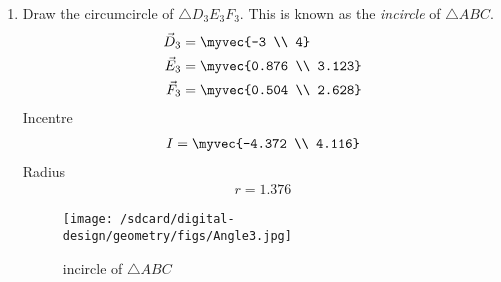 \documentclass[11pt]{book}
\begin{document}
\begin{enumerate}[label=\thesection.\arabic*.,ref=\thesection.\theenumi]
\item Draw the circumcircle of $\triangle D_3E_3F_3$.  This is known as the {\em incircle} of $\triangle ABC$. \\
\solution 
\begin{align}
    \vec{D}_3 &= \myvec{-3  \\ 4} \\
    \vec{E}_3 &= \myvec{0.876  \\ 3.123} \\
    \vec{F}_3 &= \myvec{0.504 \\ 2.628} 
\end{align}
Incentre 
\begin{align}
    I= \myvec{-4.372 \\ 4.116}
\end{align}
Radius
\begin{align}
 r=1.376
\end{align}
\begin{figure}[H]
    \centering
    \texttt{[image: /sdcard/digital-design/geometry/figs/Angle3.jpg]}
    \caption{incircle of $\triangle ABC$ }
    \label{fig:Ang_bisect3}
\end{figure}



\end{enumerate}
\end{document}
